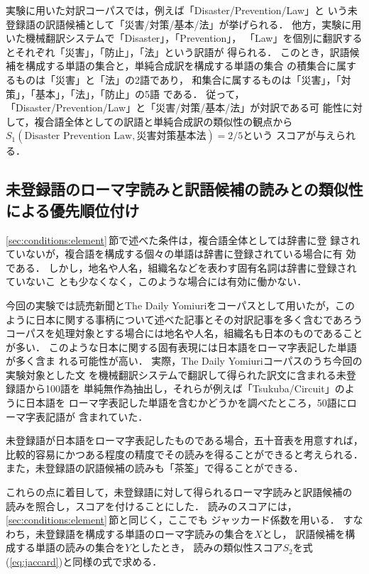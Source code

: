 実験に用いた対訳コーパスでは，例えば「Disaster/Prevention/Law」と
いう未登録語の訳語候補として「災害/対策/基本/法」が挙げられる． 
他方，実験に用いた機械翻訳システムで「Disaster」，「Prevention」，
「Law」を個別に翻訳するとそれぞれ「災害」，「防止」，「法」という訳語が
得られる．
このとき，訳語候補を構成する単語の集合と，単純合成訳を構成する単語の集合
の積集合に属するものは「災害」と「法」の2語であり， 
和集合に属するものは「災害」，「対策」，「基本」，「法」，「防止」の5語
である．
従って，「Disaster/Prevention/Law」と「災害/対策/基本/法」が対訳である可
能性に対して，複合語全体としての訳語と単純合成訳の類似性の観点から
$S_1(\mbox{Disaster Prevention Law},災害対策基本法)=2/5$という
スコアが与えられる． 


\subsection{未登録語のローマ字読みと訳語候補の読みとの類似性による優先順位付け}
\label{sec:conditions:romaji}

\ref{sec:conditions:element}\,節で述べた条件は，複合語全体としては辞書に登
録されていないが，複合語を構成する個々の単語は辞書に登録されている場合に有
効である．
しかし，地名や人名，組織名などを表わす固有名詞は辞書に登録されていないこ
とも少なくなく，このような場合には有効に働かない．

今回の実験では読売新聞とThe Daily Yomiuriをコーパスとして用いたが，この
ように日本に関する事柄について述べた記事とその対訳記事を多く含むであろう
コーパスを処理対象とする場合には地名や人名，組織名も日本のものであること
が多い．
このような日本に関する固有表現には日本語をローマ字表記した単語が多く含ま
れる可能性が高い．
実際，The Daily Yomiuriコーパスのうち今回の実験対象とした文
を機械翻訳システムで翻訳して得られた訳文に含まれる未登録語から100語を
単純無作為抽出し，それらが例えば「Tsukuba/Circuit」のように日本語を
ローマ字表記した単語を含むかどうかを調べたところ，50語にローマ字表記語が
含まれていた．  

未登録語が日本語をローマ字表記したものである場合，五十音表を用意すれば，
比較的容易にかつある程度の精度でその読みを得ることができると考えられる．
また，未登録語の訳語候補の読みも「茶筌」で得ることができる．

これらの点に着目して，未登録語に対して得られるローマ字読みと訳語候補の
読みを照合し，スコアを付けることにした．
読みのスコアには，\ref{sec:conditions:element}\,節と同じく，ここでも
ジャッカード係数を用いる．
すなわち，未登録語を構成する単語のローマ字読みの集合を$X$とし，
訳語候補を構成する単語の読みの集合を$Y$としたとき，
読みの類似性スコア$S_2$を式(\ref{eq:jaccard})と同様の式で求める．

